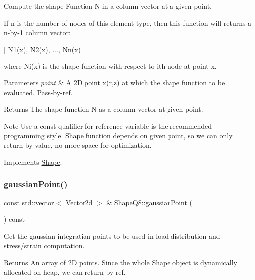 Compute the shape Function N in a column vector at a given point. 

If n is the number of nodes of this element type, then this function will returns a n-\/by-\/1 column vector\+:

\mbox{[} N1(x), N2(x), ..., Nn(x) \mbox{]}

where Ni(x) is the shape function with respect to ith node at point x.


\begin{DoxyParams}{Parameters}
{\em point} & A 2D point x(r,z) at which the shape function to be evaluated. Pass-\/by-\/ref. \\
\hline
\end{DoxyParams}
\begin{DoxyReturn}{Returns}
The shape function N as a column vector at given point.
\end{DoxyReturn}
\begin{DoxyNote}{Note}
Use a const qualifier for reference variable is the recommended programming style. \mbox{\hyperlink{class_shape}{Shape}} function depends on given point, so we can only return-\/by-\/value, no more space for optimization. 
\end{DoxyNote}


Implements \mbox{\hyperlink{class_shape_a0e0400bca54c29b5097c84ace51ecc7b}{Shape}}.

\mbox{\label{class_shape_q8_a197f1e2109c7ee6c29d27198c96928a4}} 
\subsubsection{\texorpdfstring{gaussian\+Point()}{gaussianPoint()}}
{\footnotesize\ttfamily const std\+::vector$<$ Vector2d $>$ \& Shape\+Q8\+::gaussian\+Point (\begin{DoxyParamCaption}{ }\end{DoxyParamCaption}) const\hspace{0.3cm}{\ttfamily [virtual]}}



Get the gaussian integration points to be used in load distribution and stress/strain computation. 

\begin{DoxyReturn}{Returns}
An array of 2D points. Since the whole \mbox{\hyperlink{class_shape}{Shape}} object is dynamically allocated on heap, we can return-\/by-\/ref. 
\end{DoxyReturn}


